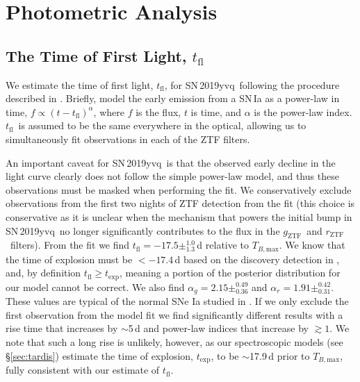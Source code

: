 \documentclass[twocolumn]{aastex63}
\newcommand{\fromkate}[1]{{\color{brown} fromKM: {#1}}}
\newcommand{\rztf}{$r_\mathrm{ZTF}$}
\newcommand{\gztf}{$g_\mathrm{ZTF}$}
\newcommand{\tfl}{$t_\mathrm{fl}$}
\newcommand{\tbmax}{$T_{B,\mathrm{max}}$}
\newcommand{\sn}{SN\,2019yvq}
\begin{document}
\section{Photometric Analysis}\label{sec:phot}

\subsection{The Time of First Light, \tfl}\label{sec:t_fl}

We estimate the time of first light, \tfl, for \sn\ following the procedure
described in \citet{Miller20}. Briefly, \citet{Miller20} model the early
emission from a SN\,Ia as a power-law in time, $f \propto (t -
t_\mathrm{fl})^\alpha$, where $f$ is the flux, $t$ is time, and $\alpha$ is
the power-law index. \tfl\ is assumed to be the same everywhere in the
optical, allowing us to simultaneously fit observations in each of the ZTF
filters.

An important caveat for \sn\ is that the observed early decline in the light
curve clearly does not follow the simple power-law model, and thus these
observations must be masked when performing the fit. We conservatively exclude
observations from the first two nights of ZTF detection from the fit (this
choice is conservative as it is unclear when the mechanism that powers the
initial bump in \sn\ no longer significantly contributes to the flux in the
\gztf\ and \rztf\ filters). From the fit we find \tfl$ = -17.5
\pm^{1.0}_{1.3}$\,d relative to \tbmax. We know that the time of explosion
must be $< -17.4$\,d based on the discovery detection in \citealt{Itagaki19},
and, by definition $t_\mathrm{fl} \ge t_\mathrm{exp}$, meaning a portion of
the posterior distribution for our model cannot be correct. We also find
$\alpha_g = 2.15 \pm^{0.49}_{0.36}$ and $\alpha_r = 1.91 \pm^{0.42}_{0.31}$.
These values are typical of the normal SNe Ia studied in \citet{Miller20}. If
we only exclude the first observation from the model fit we find significantly
different results with a rise time that increases by $\sim$5\,d and power-law
indices that increase by $\gtrsim 1$. We note that such a long rise is
unlikely, however, as our spectroscopic models (see \S\ref{sec:tardis})
estimate the time of explosion, $t_\mathrm{exp}$, to be $\sim$17.9\,d prior to
\tbmax, fully consistent with our estimate of \tfl.

\end{document}

